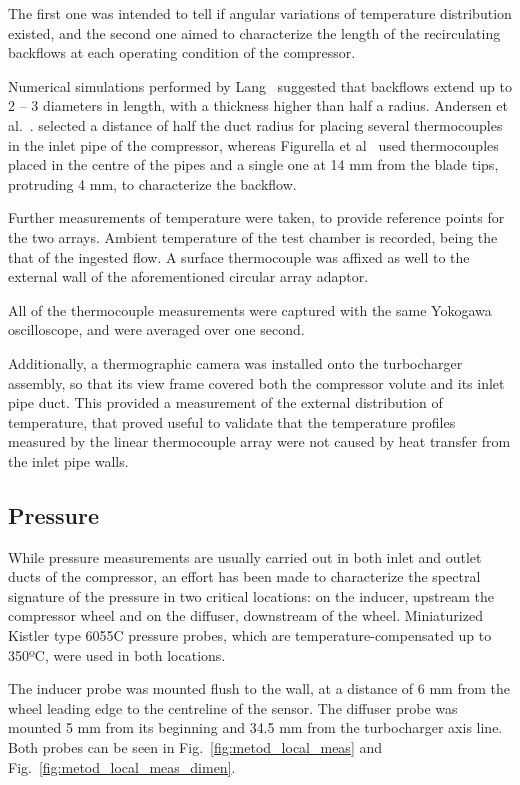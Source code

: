 The first one was intended to tell if angular variations of temperature distribution existed, and the second one aimed to characterize the length of the recirculating backflows at each operating condition of the compressor.

Numerical simulations performed by Lang~\cite{lang2011contribucion} suggested that backflows extend up to 2 -- 3 diameters in length, with a thickness higher than half a radius. Andersen et al.~\cite{andersen2009surge}. selected a distance of half the duct radius for placing several thermocouples in the inlet pipe of the compressor, whereas Figurella et al~\cite{figurella2014noise} used thermocouples placed in the centre of the pipes and a single one at 14 mm from the blade tips, protruding 4 mm, to characterize the backflow.

Further measurements of temperature were taken, to provide reference points for the two arrays. Ambient temperature of the test chamber is recorded, being the that of the ingested flow. A surface thermocouple was affixed as well to the external wall of the aforementioned circular array adaptor.

All of the thermocouple measurements were captured with the same Yokogawa oscilloscope, and were averaged over one second.

Additionally, a thermographic camera was installed onto the turbocharger assembly, so that its view frame covered both the compressor volute and its inlet pipe duct. This provided a measurement of the external distribution of temperature, that proved useful to validate that the temperature profiles measured by the linear thermocouple array were not caused by heat transfer from the inlet pipe walls.

\subsection{Pressure}

While pressure measurements are usually carried out in both inlet and outlet ducts of the compressor, an effort has been made to characterize the spectral signature of the pressure in two critical locations: on the inducer, upstream the compressor wheel and on the diffuser, downstream of the wheel. Miniaturized Kistler type 6055C pressure probes, which are temperature-compensated up to 350ºC, were used in both locations. 

The inducer probe was mounted flush to the wall, at a distance of 6 mm from the wheel leading edge to the centreline of the sensor. The diffuser probe was mounted 5 mm from its beginning and 34.5 mm from the turbocharger axis line. Both probes can be seen in Fig.~\ref{fig:metod_local_meas} and Fig.~\ref{fig:metod_local_meas_dimen}.

